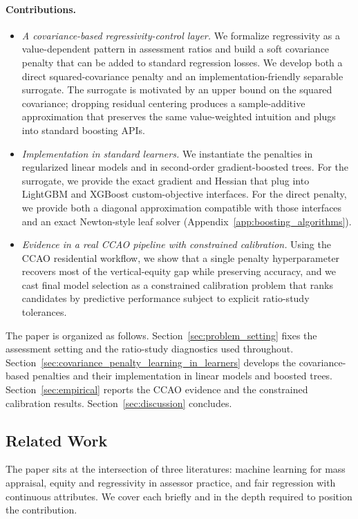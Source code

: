 \documentclass{article}
\theoremstyle{plain}
\theoremstyle{definition}
\newcommand{\1}{\mathbf{1}}
\begin{document}
\paragraph{Contributions.}
\begin{itemize}
    \item \textit{A covariance-based regressivity-control layer.} We formalize regressivity as a value-dependent pattern in assessment ratios and build a soft covariance penalty that can be added to standard regression losses. We develop both a direct squared-covariance penalty and an implementation-friendly separable surrogate. The surrogate is motivated by an upper bound on the squared covariance; dropping residual centering produces a sample-additive approximation that preserves the same value-weighted intuition and plugs into standard boosting APIs.
    \item \textit{Implementation in standard learners.} We instantiate the penalties in regularized linear models and in second-order gradient-boosted trees. For the surrogate, we provide the exact gradient and Hessian that plug into LightGBM and XGBoost custom-objective interfaces. For the direct penalty, we provide both a diagonal approximation compatible with those interfaces and an exact Newton-style leaf solver (Appendix~\ref{app:boosting_algorithms}).
    \item \textit{Evidence in a real CCAO pipeline with constrained calibration.} Using the CCAO residential workflow, we show that a single penalty hyperparameter recovers most of the vertical-equity gap while preserving accuracy, and we cast final model selection as a constrained calibration problem that ranks candidates by predictive performance subject to explicit ratio-study tolerances.
\end{itemize}

The paper is organized as follows. Section~\ref{sec:problem_setting} fixes the assessment setting and the ratio-study diagnostics used throughout. Section~\ref{sec:covariance_penalty_learning_in_learners} develops the covariance-based penalties and their implementation in linear models and boosted trees. Section~\ref{sec:empirical} reports the CCAO evidence and the constrained calibration results. Section~\ref{sec:discussion} concludes.

\subsection{Related Work}

The paper sits at the intersection of three literatures: machine learning for mass appraisal, equity and regressivity in assessor practice, and fair regression with continuous attributes. We cover each briefly and in the depth required to position the contribution.
\end{document}
